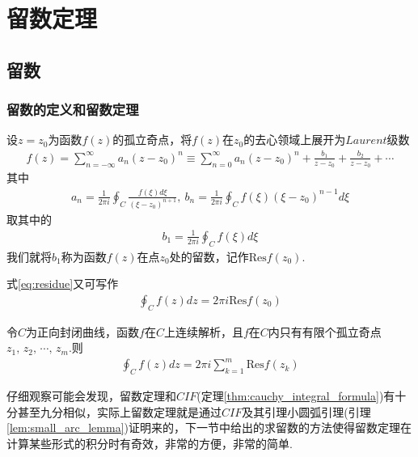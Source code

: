 \chapter{留数定理}
\section{留数}
    \subsection{留数的定义和留数定理}
        设$z=z_0$为函数$f(z)$的孤立奇点，将$f(z)$在$z_0$的去心领域上展开为$Laurent$级数
        \begin{align*}
            f(z)=\sum_{n=-\infty}^{\infty}a_n(z-z_0)^n\equiv \sum_{n=0}^{\infty}a_n(z-z_0)^n + \frac{b_1}{z-z_0}+\frac{b_2}{z-z_0}+\cdots
        \end{align*}
        其中
        \begin{align*}
            a_n=\frac1{2\pi i}\oint_C \frac{f(\xi)d\xi}{(\xi - z_0)^{n+1}},\ b_n=\frac1{2\pi i}\oint_C f(\xi)(\xi - z_0)^{n-1}d\xi
        \end{align*}
        取其中的
        \begin{align}
            \label{eq:residue}
            b_1=\frac1{2\pi i}\oint_C f(\xi)d\xi
        \end{align}
        我们就将$b_1$称为函数$f(z)$在点$z_0$处的留数，记作$\mathrm{Res} f(z_0)$.

        式\ref{eq:residue}又可写作
        \begin{align*}
            \oint_C f(z)dz=2\pi i \mathrm{Res} f(z_0)
        \end{align*}

        \begin{theorem}[留数定理]\label{thm:residue_theorem}
            令$C$为正向封闭曲线，函数$f$在$C$上连续解析，且$f$在$C$内只有有限个孤立奇点$z_1,\,z_2,\,\cdots,\,z_m$.则
            \begin{align*}
                \oint_C f(z)dz=2\pi i\sum_{k=1}^{m}\mathrm{Res}f(z_k)
            \end{align*}
        \end{theorem}

        仔细观察可能会发现，留数定理和$CIF$(定理\ref{thm:cauchy_integral_formula})有十分甚至九分相似，实际上留数定理就是通过$CIF$及其引理小圆弧引理(引理\ref{lem:small_arc_lemma})证明来的，下一节中给出的求留数的方法使得留数定理在计算某些形式的积分时有奇效，非常的方便，非常的简单.

